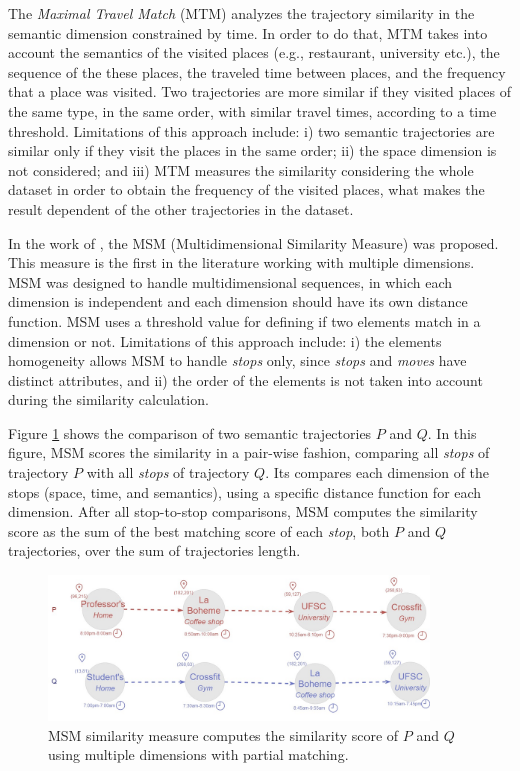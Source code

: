 The \emph{Maximal Travel Match} (MTM)\cite{Xiao:2010:FSU:1869790.1869857} analyzes the trajectory similarity in the semantic dimension constrained by time. In order to do that, MTM takes into account the semantics of the visited places (e.g., restaurant, university etc.), the sequence of the these places, the traveled time between places, and the frequency that a place was visited. Two trajectories are more similar if they visited places of the same type, in the same order, with similar travel times, according to a time threshold. Limitations of this approach include: i) two semantic trajectories are similar only if they visit the places in the same order; ii) the space dimension is not considered; and iii) MTM measures the similarity considering the whole dataset in order to obtain the frequency of the visited places, what makes the result dependent of the other trajectories in the dataset.

In the work of \cite{Furtado:TGIS12156}, the MSM (Multidimensional Similarity Measure) was proposed. This measure is the first in the literature working with multiple dimensions. MSM was designed to handle multidimensional sequences, in which each dimension is independent and each dimension should have its own distance function. MSM uses a threshold value for defining if two elements match in a dimension or not. Limitations of this approach include: i) the elements homogeneity allows MSM to handle \textit{stops} only, since \textit{stops} and \textit{moves} have distinct attributes, and ii) the order of the elements is not taken into account during the similarity calculation.

Figure \ref{fig:related_trajes_MSM} shows the comparison of two semantic trajectories $P$ and $Q$. In this figure, MSM scores the similarity in a pair-wise fashion, comparing all \emph{stops} of trajectory $P$ with all \emph{stops} of trajectory $Q$. Its compares each dimension of the stops (space, time, and semantics), using a specific distance function for each dimension. After all stop-to-stop comparisons, MSM computes the similarity score as the sum of the best matching score of each \emph{stop}, both $P$ and $Q$ trajectories, over the sum of trajectories length.

\begin{figure}[h]
\centering
\includegraphics[width=0.9\textwidth]{Related_Works/Semantic_Trajectories_(MSM).jpg}
\caption{\label{fig:related_trajes_MSM}MSM similarity measure computes the similarity score of $P$ and $Q$ using multiple dimensions with partial matching.}
\end{figure}


